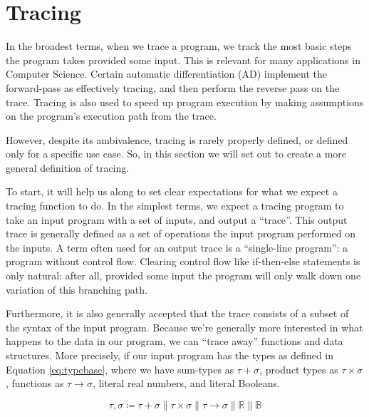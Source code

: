 \section{Tracing}
    In the broadest terms, when we trace a program, we track the most basic steps the program takes provided some input.
    This is relevant for many applications in Computer Science.
    Certain automatic differentiation (AD) implement the forward-pass as effectively tracing, and then perform the reverse pass on the trace\cn.
    Tracing is also used to speed up program execution by making assumptions on the program's execution path from the trace\cn.

    However, despite its ambivalence, tracing is rarely properly defined, or defined only for a specific use case.
    So, in this section we will set out to create a more general definition of tracing.
    
    To start, it will help us along to set clear expectations for what we expect a tracing function to do.
    In the simplest terms, we expect a tracing program to take an input program with a set of inputs, and output a ``trace''.
    This output trace is generally defined as a set of operations the input program performed on the inputs.
    A term often used for an output trace is a ``single-line program''\cn: a program without control flow.
    Clearing control flow like if-then-else statements is only natural: after all, provided some input the program will only walk down one variation of this branching path.

    Furthermore, it is also generally accepted that the trace consists of a subset of the syntax of the input program.
    Because we're generally more interested in what happens to the data in our program, we can ``trace away'' functions and data structures.
    More precisely, if our input program has the types as defined in Equation \ref{eq:typebase}, where we have sum-types as $\tau+\sigma$, product types as $\tau\times\sigma$, functions as $\tau\to\sigma$, literal real numbers, and literal Booleans.

    \begin{equation}
        \label{eq:typebase}
        \tau,\sigma\coloneqq\tau+\sigma\|\tau\times\sigma\|\tau\to\sigma\|\mathbb{R}\|\mathbb{B}
    \end{equation}

